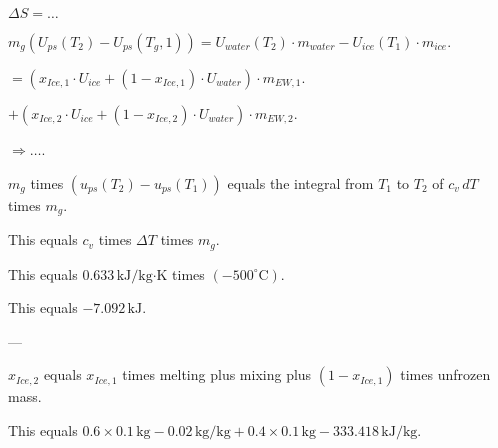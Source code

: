 \( \Delta S = \dots \)  

\( m_g (U_{ps}(T_2) - U_{ps}(T_g,1)) = U_{water}(T_2) \cdot m_{water} - U_{ice}(T_1) \cdot m_{ice} \).  

\( = (x_{Ice,1} \cdot U_{ice} + (1 - x_{Ice,1}) \cdot U_{water}) \cdot m_{EW,1} \).  

\( + (x_{Ice,2} \cdot U_{ice} + (1 - x_{Ice,2}) \cdot U_{water}) \cdot m_{EW,2} \).  

\( \Rightarrow \dots \).

\( m_g \) times \( (u_{ps}(T_2) - u_{ps}(T_1)) \) equals the integral from \( T_1 \) to \( T_2 \) of \( c_v \, dT \) times \( m_g \).  

This equals \( c_v \) times \( \Delta T \) times \( m_g \).  

This equals \( 0.633 \, \text{kJ/kg·K} \) times \( (-500^\circ \text{C}) \).  

This equals \( -7.092 \, \text{kJ} \).  

---

\( x_{Ice,2} \) equals \( x_{Ice,1} \) times melting plus mixing plus \( (1 - x_{Ice,1}) \) times unfrozen mass.  

This equals \( 0.6 \times 0.1 \, \text{kg} - 0.02 \, \text{kg/kg} + 0.4 \times 0.1 \, \text{kg} - 333.418 \, \text{kJ/kg} \).